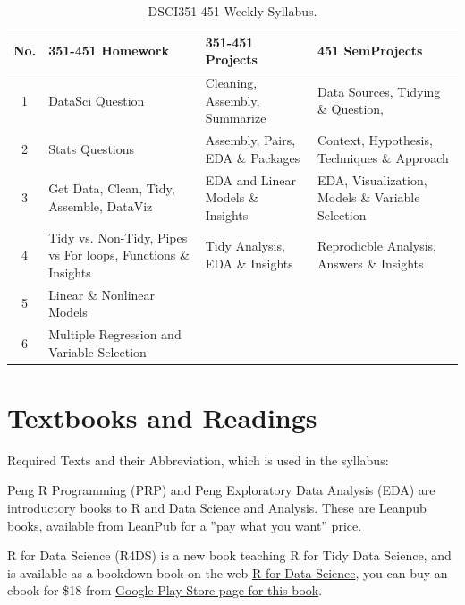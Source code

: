 \documentclass[11pt]{article} %
\begin{document}
  \begin{table}[h] 
  	\centering %
  	\begin{tabular}{| c | p{4cm} | p{4cm} | p{4cm}|} %
  	\hline %
  	No. & 351-451 Homework & 351-451 Projects & 451 SemProjects \\ %
  	\hline 
  	\hline %
      1 & DataSci Question & Cleaning, Assembly, Summarize & Data Sources, Tidying \& Question, \\ %
  	\hline %
  	2 & Stats Questions & Assembly, Pairs, EDA \& Packages & Context, Hypothesis, 
      Techniques \& Approach  \\ 
  	\hline  
  	3 & Get Data, Clean, Tidy, Assemble, DataViz & EDA and Linear Models \& Insights & EDA, Visualization, Models \& Variable Selection  \\ 
  	\hline
  	 4 &  Tidy vs. Non-Tidy, Pipes vs For loops, Functions \& Insights & Tidy Analysis, EDA \& Insights & Reprodicble Analysis, Answers \& Insights \\
  	\hline 
  	5 &  Linear \& Nonlinear Models & & \\
      \hline 
      6 &  Multiple Regression and Variable Selection & & \\
      \hline 
      \hline
  	
  \end{tabular} 
  \caption{DSCI351-451 Weekly Syllabus.}
  \label{table:Syllabus} %
  \end{table} 

\section{Textbooks and Readings}

  Required Texts and their Abbreviation, which is used in the syllabus:
  
  Peng R Programming (PRP) and Peng Exploratory Data Analysis (EDA) are introductory books to R and Data Science and Analysis. 
  These are  Leanpub books, available from LeanPub for a ”pay what you want” price. 
  
  R for Data Science (R4DS) is a new book teaching R for Tidy Data Science, and is available as a bookdown book on the web \href{http://r4ds.had.co.nz/}{R for Data Science}, you can buy an ebook for \$18 from \href{https://play.google.com/store/books/details/Hadley_Wickham_R_for_Data_Science?id=I6y3DQAAQBAJ}{Google Play Store page for this book}. 
  
\end{document}
